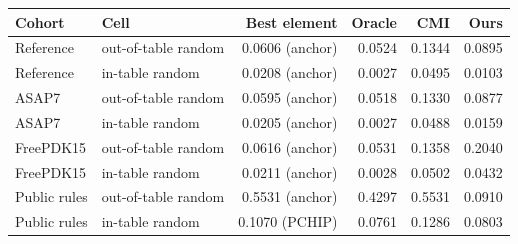 \small
\begin{tabular}{llrrrr}\toprule
Cohort & Cell & Best element & Oracle & CMI & Ours \\\midrule
Reference & out-of-table random & 0.0606 (anchor) & 0.0524 & 0.1344 & 0.0895 \\
Reference & in-table random & 0.0208 (anchor) & 0.0027 & 0.0495 & 0.0103 \\
ASAP7 & out-of-table random & 0.0595 (anchor) & 0.0518 & 0.1330 & 0.0877 \\
ASAP7 & in-table random & 0.0205 (anchor) & 0.0027 & 0.0488 & 0.0159 \\
FreePDK15 & out-of-table random & 0.0616 (anchor) & 0.0531 & 0.1358 & 0.2040 \\
FreePDK15 & in-table random & 0.0211 (anchor) & 0.0028 & 0.0502 & 0.0432 \\
Public rules & out-of-table random & 0.5531 (anchor) & 0.4297 & 0.5531 & 0.0910 \\
Public rules & in-table random & 0.1070 (PCHIP) & 0.0761 & 0.1286 & 0.0803 \\
\bottomrule\end{tabular}
